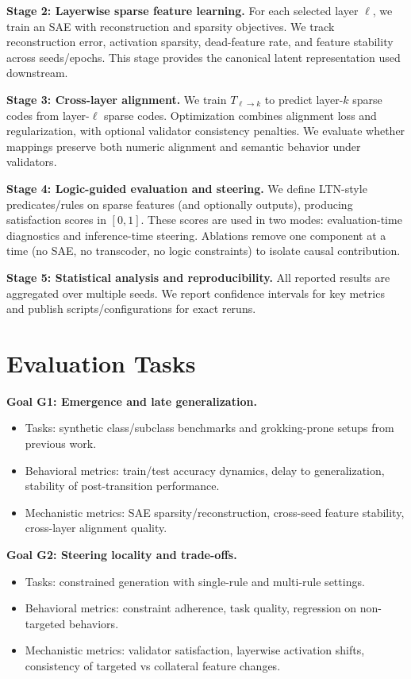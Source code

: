 \documentclass[../ppgc-tese.tex]{subfiles}
\begin{document}
\textbf{Stage 2: Layerwise sparse feature learning.}
For each selected layer $\ell$, we train an SAE with reconstruction and sparsity objectives. We track reconstruction error, activation sparsity, dead-feature rate, and feature stability across seeds/epochs. This stage provides the canonical latent representation used downstream.

\textbf{Stage 3: Cross-layer alignment.}
We train $T_{\ell\to k}$ to predict layer-$k$ sparse codes from layer-$\ell$ sparse codes. Optimization combines alignment loss and regularization, with optional validator consistency penalties. We evaluate whether mappings preserve both numeric alignment and semantic behavior under validators.

\textbf{Stage 4: Logic-guided evaluation and steering.}
We define LTN-style predicates/rules on sparse features (and optionally outputs), producing satisfaction scores in $[0,1]$. These scores are used in two modes: evaluation-time diagnostics and inference-time steering. Ablations remove one component at a time (no SAE, no transcoder, no logic constraints) to isolate causal contribution.

\textbf{Stage 5: Statistical analysis and reproducibility.}
All reported results are aggregated over multiple seeds. We report confidence intervals for key metrics and publish scripts/configurations for exact reruns.

\section{Evaluation Tasks}
\textbf{Goal G1: Emergence and late generalization.}
\begin{itemize}
    \item Tasks: synthetic class/subclass benchmarks and grokking-prone setups from previous work.
    \item Behavioral metrics: train/test accuracy dynamics, delay to generalization, stability of post-transition performance.
    \item Mechanistic metrics: SAE sparsity/reconstruction, cross-seed feature stability, cross-layer alignment quality.
\end{itemize}

\textbf{Goal G2: Steering locality and trade-offs.}
\begin{itemize}
    \item Tasks: constrained generation with single-rule and multi-rule settings.
    \item Behavioral metrics: constraint adherence, task quality, regression on non-targeted behaviors.
    \item Mechanistic metrics: validator satisfaction, layerwise activation shifts, consistency of targeted vs collateral feature changes.
\end{itemize}
\end{document}

